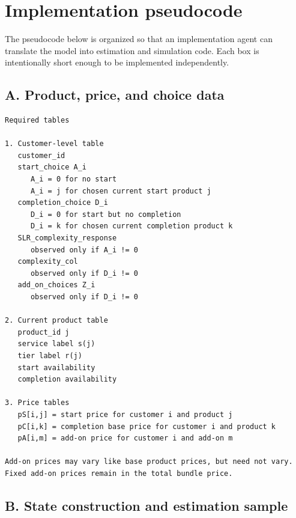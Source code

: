 \documentclass[11pt]{article}
\begin{document}
\newpage
\section{Implementation pseudocode}

The pseudocode below is organized so that an implementation agent can translate the model into estimation and simulation code. Each box is intentionally short enough to be implemented independently.

\subsection*{A. Product, price, and choice data}

\begin{Verbatim}[fontsize=\small, frame=single]
Required tables

1. Customer-level table
   customer_id
   start_choice A_i
      A_i = 0 for no start
      A_i = j for chosen current start product j
   completion_choice D_i
      D_i = 0 for start but no completion
      D_i = k for chosen current completion product k
   SLR_complexity_response
      observed only if A_i != 0
   complexity_col
      observed only if D_i != 0
   add_on_choices Z_i
      observed only if D_i != 0

2. Current product table
   product_id j
   service label s(j)
   tier label r(j)
   start availability
   completion availability

3. Price tables
   pS[i,j] = start price for customer i and product j
   pC[i,k] = completion base price for customer i and product k
   pA[i,m] = add-on price for customer i and add-on m

Add-on prices may vary like base product prices, but need not vary.
Fixed add-on prices remain in the total bundle price.
\end{Verbatim}

\newpage
\subsection*{B. State construction and estimation sample}
\end{document}
